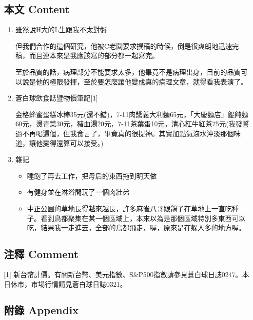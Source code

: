 \documentclass[a5paper, 11pt
]{book}
\providecommand{\tightlist}{%
  \setlength{\itemsep}{0pt}\setlength{\parskip}{0pt}}
\begin{document}
\hypertarget{ux672cux6587-content-66}{%
\subsection{本文 Content}\label{ux672cux6587-content-66}}

\begin{enumerate}
\def\labelenumi{\arabic{enumi}.}
\item
  雖然說H大的L生跟我不太對盤

  但我們合作的這個研究，他被C老闆要求撰稿的時候，倒是很爽朗地迅速完稿，而且連本來是我應該寫的部分都一起寫完。

  至於品質的話，病理部分不能要求太多，他畢竟不是病理出身，目前的品質可以說是他的極限發揮，至於要怎麼讓他變成真的病理文章，就得看我表演了。
\item
  蒼白球飲食誌暨物價筆記{[}1{]}

  金格蜂蜜蛋糕冰棒35元(還不錯)，7-11肉醬義大利麵65元，「大慶麵店」餛飩麵60元，燙青菜30元，豬血湯20元，7-11茶葉蛋10元，清心紅牛紅茶75元(我發誓過不再喝這個，但我食言了，畢竟真的很提神。其實加點氣泡水沖淡那個味道，讓他變得還算可以接受。)
\item
  雜記

  \begin{itemize}
  \tightlist
  \item
    睡飽了再去工作，把母后的東西拖到明天做
  \item
    有健身並在淋浴間玩了一個肉壯弟
  \item
    中正公園的草地長得越來越長，許多麻雀八哥跟鴿子在草地上一直吃種子。看到鳥都聚集在某一個區域上，本來以為是那個區域特別多東西可以吃，結果我一走進去，全部的鳥都飛走，喔，原來是在躲人多的地方喔。
  \end{itemize}
\end{enumerate}

\hypertarget{ux6ce8ux91cb-comment-66}{%
\subsection{注釋 Comment}\label{ux6ce8ux91cb-comment-66}}

{[}1{]}
新台幣計價。有關新台幣、美元指數、S\&P500指數請參見蒼白球日誌0247。本日休市，市場行情請見蒼白球日誌0321。

\hypertarget{ux9644ux9304-appendix-66}{%
\subsection{附錄 Appendix}\label{ux9644ux9304-appendix-66}}
\end{document}
